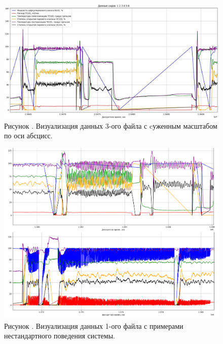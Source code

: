 {  \begin{figure}
    \centering
    \def\svgwidth{\textwidth}
    \includegraphics[scale=0.6]{images/data_3_visual.jpg}
    \caption*{\gostFont Рисунок \thechaptercntr .\theimagecntr \spc {--} Визуализация данных 3-ого файла с cуженным масштабом по оси абсцисс.}
    \label{fig:Data3Visual}
  \end{figure} \addtocounter{imagecntr}{1}

  \begin{figure}
    \centering
    \def\svgwidth{\textwidth}
    \includegraphics[scale=0.5]{images/data_1_anomaly.png}
    \caption*{\gostFont Рисунок \thechaptercntr .\theimagecntr \spc {--} Визуализация данных 1-ого файла с примерами нестандартного поведения системы.}
    \label{fig:Data1VisualAnomaly}
  \end{figure} \addtocounter{imagecntr}{1}

}

